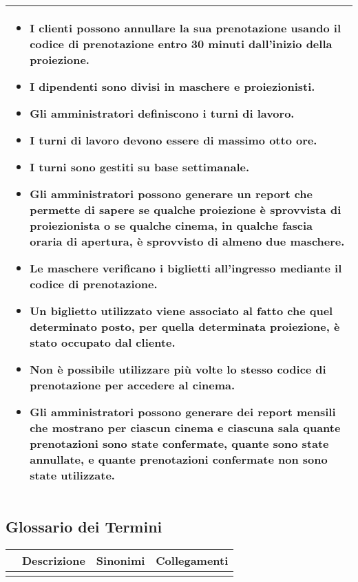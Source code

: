 \begin{tabularx}{\linewidth}{|X|}
\begin{itemize}
        \item I clienti possono annullare la sua prenotazione usando il codice
              di prenotazione entro 30 minuti dall'inizio della proiezione.
        \item I dipendenti sono divisi in maschere e proiezionisti.
        \item Gli amministratori definiscono i turni di lavoro.
        \item I turni di lavoro devono essere di massimo otto ore.
        \item I turni sono gestiti su base settimanale.
        \item Gli amministratori possono generare un report che permette di
              sapere se qualche proiezione è sprovvista di proiezionista o se
              qualche cinema, in qualche fascia oraria di apertura, è sprovvisto
              di almeno due maschere.
        \item Le maschere verificano i biglietti all'ingresso mediante il codice
              di prenotazione.
        \item Un biglietto utilizzato viene associato al fatto che quel
              determinato posto, per quella determinata proiezione, è stato
              occupato dal cliente.
        \item Non è possibile utilizzare più volte lo stesso codice di
              prenotazione per accedere al cinema.
        \item Gli amministratori possono generare dei report mensili che
              mostrano per ciascun cinema e ciascuna sala quante prenotazioni
              sono state confermate, quante sono state annullate, e quante
              prenotazioni confermate non sono state utilizzate.
    \end{itemize}
    \\\hline
\end{tabularx}

\subsection*{Glossario dei Termini}
%
%
\begin{tabularx}{\linewidth}{|X|X|X|X|}
    \hline
    \rowcolor{tblhdrcolor}
    \multicolumn{1}{|c|}{\textbf{Termine}}
     & \multicolumn{1}{|c|}{\textbf{Descrizione}}
     & \multicolumn{1}{|c|}{\textbf{Sinonimi}}
     & \multicolumn{1}{|c|}{\textbf{Collegamenti}}
    \\\hline
    \hfill
     & \hfill
     & \hfill
     & \hfill
    \\ \hline
\end{tabularx}

